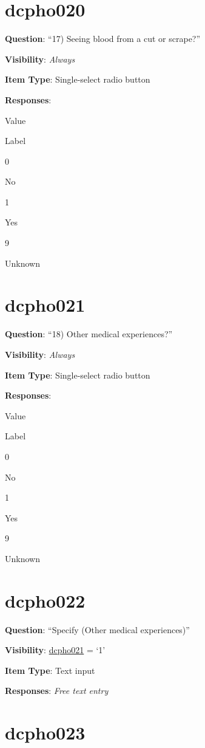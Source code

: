 \documentclass[]{book}
\begin{document}
\hypertarget{dcpho020}{%
\section{dcpho020}\label{dcpho020}}

\textbf{Question}: ``17) Seeing blood from a cut or scrape?''

\textbf{Visibility}: \emph{Always}

\textbf{Item Type}: Single-select radio button

\textbf{Responses}:

Value

Label

0

No

1

Yes

9

Unknown

\hypertarget{dcpho021}{%
\section{dcpho021}\label{dcpho021}}

\textbf{Question}: ``18) Other medical experiences?''

\textbf{Visibility}: \emph{Always}

\textbf{Item Type}: Single-select radio button

\textbf{Responses}:

Value

Label

0

No

1

Yes

9

Unknown

\hypertarget{dcpho022}{%
\section{dcpho022}\label{dcpho022}}

\textbf{Question}: ``Specify (Other medical experiences)''

\textbf{Visibility}: \protect\hyperlink{dcpho021}{dcpho021} = `1'

\textbf{Item Type}: Text input

\textbf{Responses}: \emph{Free text entry}

\hypertarget{dcpho023}{%
\section{dcpho023}\label{dcpho023}}
\end{document}
